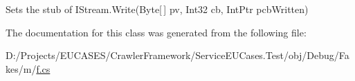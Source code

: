 Sets the stub of I\-Stream.\-Write(\-Byte\mbox{[}$\,$\mbox{]} pv, Int32 cb, Int\-Ptr pcb\-Written)



The documentation for this class was generated from the following file\-:\begin{DoxyCompactItemize}
\item 
D\-:/\-Projects/\-E\-U\-C\-A\-S\-E\-S/\-Crawler\-Framework/\-Service\-E\-U\-Cases.\-Test/obj/\-Debug/\-Fakes/m/\hyperlink{m_2f_8cs}{f.\-cs}\end{DoxyCompactItemize}
